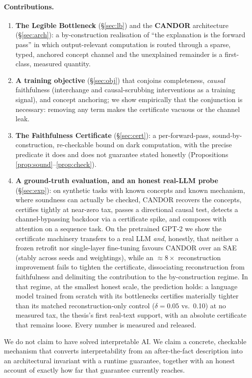 \documentclass[11pt]{article}
\providecommand{\ftReconGain}{8}
\providecommand{\lmReconDelta}{0.10}\providecommand{\lmReconDeltaStd}{0.01}
\providecommand{\lmCandorDelta}{0.05}\providecommand{\lmCandorDeltaStd}{0.01}
\begin{document}
\paragraph{Contributions.}
\begin{enumerate}[leftmargin=1.4em,itemsep=1pt]
\item \textbf{The Legible Bottleneck} (\S\ref{sec:lb}) and the \textbf{CANDOR}
architecture (\S\ref{sec:arch}): a by-construction realisation of ``the explanation
is the forward pass'' in which output-relevant computation is routed through a sparse,
typed, anchored concept channel and the unexplained remainder is a first-class,
measured quantity.
\item \textbf{A training objective} (\S\ref{sec:obj}) that conjoins completeness,
\emph{causal} faithfulness (interchange and causal-scrubbing interventions as a
training signal), and concept anchoring; we show empirically that the conjunction is necessary: removing
any term makes the certificate vacuous or the channel leak.
\item \textbf{The Faithfulness Certificate} (\S\ref{sec:cert}): a per-forward-pass,
sound-by-construction, re-checkable bound on dark computation, with the precise
predicate it does and does not guarantee stated honestly (Propositions
\ref{prop:sound}--\ref{prop:check}).
\item \textbf{A ground-truth evaluation, and an honest real-LLM probe} (\S\ref{sec:exp}):
on synthetic tasks with known concepts and known mechanism, where soundness can actually
be checked, CANDOR recovers the concepts, certifies tightly at near-zero tax, passes a
directional causal test, detects a channel-bypassing backdoor via a certificate spike, and
composes with attention on a sequence task. On the pretrained GPT-2 we show the certificate
machinery transfers to a real LLM \emph{and}, honestly, that neither a frozen retrofit nor
single-layer fine-tuning favours CANDOR over an SAE (stably across seeds and
weightings), while an
$\approx\ftReconGain{}\times$ reconstruction improvement fails to tighten the
certificate, dissociating reconstruction from faithfulness and delimiting the
contribution to the by-construction regime. In that regime, at the smallest honest
scale, the prediction holds: a language model trained from scratch with its
bottlenecks certifies materially tighter than its matched reconstruction-only
control ($\delta=\lmCandorDelta{}$ vs.\ \lmReconDelta{}) at no measured tax, the
thesis's first real-text support, with an absolute certificate that remains loose.
Every number is measured and released.
\end{enumerate}
We do not claim to have solved interpretable AI. We claim a concrete,
checkable mechanism that converts interpretability from an after-the-fact description
into an architectural invariant with a runtime guarantee, together with an honest
account of exactly how far that guarantee currently reaches.
\end{document}
